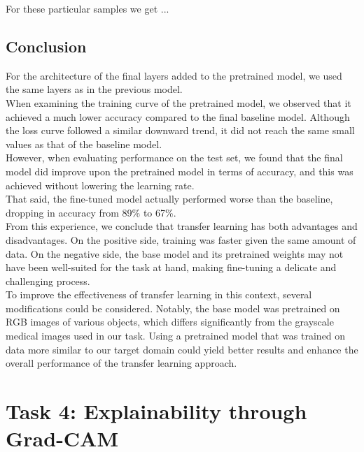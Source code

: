 \documentclass[conference]{IEEEtran}
\begin{document}
For these particular samples we get ...\\

\subsection{Conclusion}
For the architecture of the final layers added to the pretrained model, we used the same layers as in the previous model.\\

When examining the training curve of the pretrained model, we observed that it achieved a much lower accuracy compared to the final baseline model. Although the loss curve followed a similar downward trend, it did not reach the same small values as that of the baseline model.\\

However, when evaluating performance on the test set, we found that the final model did improve upon the pretrained model in terms of accuracy, and this was achieved without lowering the learning rate.\\

That said, the fine-tuned model actually performed worse than the baseline, dropping in accuracy from 89\% to 67\%.\\

From this experience, we conclude that transfer learning has both advantages and disadvantages. On the positive side, training was faster given the same amount of data. On the negative side, the base model and its pretrained weights may not have been well-suited for the task at hand, making fine-tuning a delicate and challenging process.\\

To improve the effectiveness of transfer learning in this context, several modifications could be considered. Notably, the base model was pretrained on RGB images of various objects, which differs significantly from the grayscale medical images used in our task. Using a pretrained model that was trained on data more similar to our target domain could yield better results and enhance the overall performance of the transfer learning approach.\\






\section{Task 4: Explainability through Grad-CAM} \label{sec:task_4}
\end{document}
